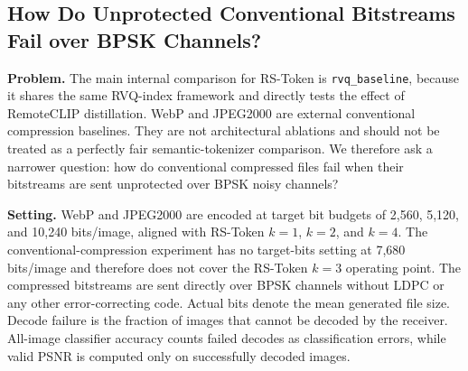 \documentclass[lettersize,journal]{IEEEtran}
\begin{document}
\subsection{How Do Unprotected Conventional Bitstreams Fail over BPSK Channels?}
\textbf{Problem.} The main internal comparison for RS-Token is \texttt{rvq\_baseline}, because it shares the same RVQ-index framework and directly tests the effect of RemoteCLIP distillation. WebP and JPEG2000 are external conventional compression baselines. They are not architectural ablations and should not be treated as a perfectly fair semantic-tokenizer comparison. We therefore ask a narrower question: how do conventional compressed files fail when their bitstreams are sent unprotected over BPSK noisy channels?

\textbf{Setting.} WebP and JPEG2000 are encoded at target bit budgets of 2{,}560, 5{,}120, and 10{,}240 bits/image, aligned with RS-Token $k=1$, $k=2$, and $k=4$. The conventional-compression experiment has no target-bits setting at 7{,}680 bits/image and therefore does not cover the RS-Token $k=3$ operating point. The compressed bitstreams are sent directly over BPSK channels without LDPC or any other error-correcting code. Actual bits denote the mean generated file size. Decode failure is the fraction of images that cannot be decoded by the receiver. All-image classifier accuracy counts failed decodes as classification errors, while valid PSNR is computed only on successfully decoded images.
\end{document}
